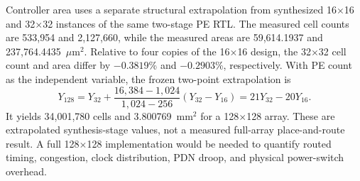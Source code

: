 Controller area uses a separate structural extrapolation from synthesized
16$\times$16 and 32$\times$32 instances of the same two-stage PE RTL.  The
measured cell counts are 533,954 and 2,127,660, while the measured areas are
59,614.1937 and 237,764.4435~$\mu\mathrm{m}^{2}$.  Relative to four copies of
the 16$\times$16 design, the 32$\times$32 cell count and area differ by
$-0.3819$\% and $-0.2903$\%, respectively.  With PE count as the independent
variable, the frozen two-point extrapolation is
\begin{equation}
  Y_{128}=Y_{32}+\frac{16{,}384-1{,}024}{1{,}024-256}
  (Y_{32}-Y_{16})=21Y_{32}-20Y_{16}.
  \label{eq:structural-extrapolation}
\end{equation}
It yields 34,001,780 cells and 3.800769~mm$^{2}$ for a 128$\times$128 array.
These are extrapolated synthesis-stage values, not a measured full-array
place-and-route result.  A full 128$\times$128 implementation would be needed
to quantify routed timing, congestion, clock distribution, PDN droop, and
physical power-switch overhead.
